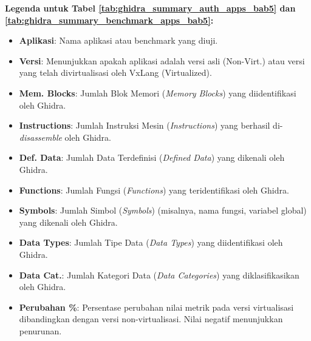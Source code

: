 \noindent \textbf{Legenda untuk Tabel \ref{tab:ghidra_summary_auth_apps_bab5} dan \ref{tab:ghidra_summary_benchmark_apps_bab5}:}
\begin{itemize}
    \item \textbf{Aplikasi}: Nama aplikasi atau benchmark yang diuji.
    \item \textbf{Versi}: Menunjukkan apakah aplikasi adalah versi asli (Non-Virt.) atau versi yang telah divirtualisasi oleh VxLang (Virtualized).
    \item \textbf{Mem. Blocks}: Jumlah Blok Memori (\textit{Memory Blocks}) yang diidentifikasi oleh Ghidra.
    \item \textbf{Instructions}: Jumlah Instruksi Mesin (\textit{Instructions}) yang berhasil di-\textit{disassemble} oleh Ghidra.
    \item \textbf{Def. Data}: Jumlah Data Terdefinisi (\textit{Defined Data}) yang dikenali oleh Ghidra.
    \item \textbf{Functions}: Jumlah Fungsi (\textit{Functions}) yang teridentifikasi oleh Ghidra.
    \item \textbf{Symbols}: Jumlah Simbol (\textit{Symbols}) (misalnya, nama fungsi, variabel global) yang dikenali oleh Ghidra.
    \item \textbf{Data Types}: Jumlah Tipe Data (\textit{Data Types}) yang diidentifikasi oleh Ghidra.
    \item \textbf{Data Cat.}: Jumlah Kategori Data (\textit{Data Categories}) yang diklasifikasikan oleh Ghidra.
    \item \textbf{Perubahan \%}: Persentase perubahan nilai metrik pada versi virtualisasi dibandingkan dengan versi non-virtualisasi. Nilai negatif menunjukkan penurunan.
\end{itemize}

